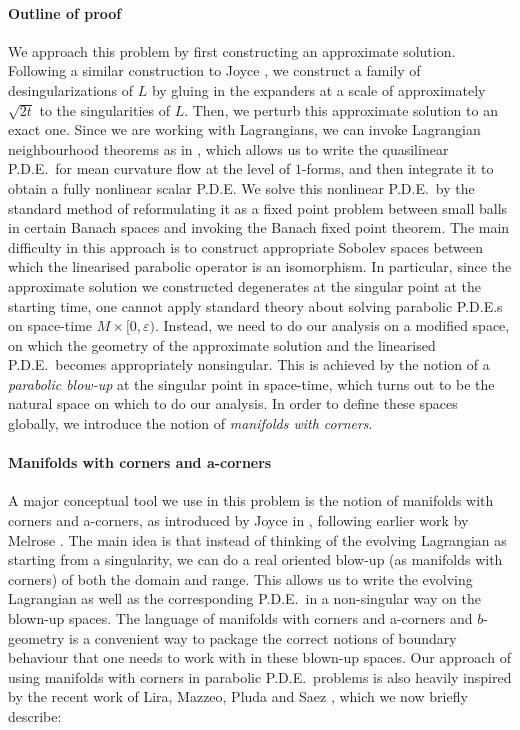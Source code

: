 \documentclass[10pt, a4paper]{article}
\theoremstyle{plain}%
\theoremstyle{definition}
\numberwithin{figure}{section}
\numberwithin{equation}{section}
\newcommand{\ep}{\varepsilon}
\begin{document}
\paragraph*{\textbf{Outline of proof}} We approach this problem by first constructing an approximate solution. Following a similar construction to Joyce \cite{Joy04}, we construct a family of desingularizations of $L$ by gluing in the expanders at a scale of approximately $\sqrt{2t}$ to the singularities of $L$. Then, we perturb this approximate solution to an exact one. Since we are working with Lagrangians, we can invoke Lagrangian neighbourhood theorems as in \cite{Joy04}, which allows us to write the quasilinear P.D.E.\ for mean curvature flow at the level of $1$-forms, and then integrate it to obtain a fully nonlinear scalar P.D.E. We solve this nonlinear P.D.E.\ by the standard method of reformulating it as a fixed point problem between small balls in certain Banach spaces and invoking the Banach fixed point theorem. The main difficulty in this approach is to construct appropriate Sobolev spaces between which the linearised parabolic operator is an isomorphism. In particular, since the approximate solution we constructed degenerates at the singular point at the starting time, one cannot apply standard theory about solving parabolic P.D.E.s on space-time $M\times[0,\ep)$. Instead, we need to do our analysis on a modified space, on which the geometry of the approximate solution and the linearised P.D.E.\ becomes appropriately nonsingular. This is achieved by the notion of a \textit{parabolic blow-up} at the singular point in space-time, which turns out to be the natural space on which to do our analysis. In order to define these spaces globally, we introduce the notion of \textit{manifolds with corners}. 



\paragraph*{\textbf{Manifolds with corners and a-corners}}
A major conceptual tool we use in this problem is the notion of manifolds with corners and a-corners, as introduced by Joyce in \cite{Joy16}, following earlier work by Melrose \cite{Mel90,Mel93,Mel96}. The main idea is that instead of thinking of the evolving Lagrangian as starting from a singularity, we can do a real oriented blow-up (as manifolds with corners) of both the domain and range. This allows us to write the evolving Lagrangian as well as the corresponding P.D.E.\ in a non-singular way on the blown-up spaces. The language of manifolds with corners and a-corners and $b$-geometry is a convenient way to package the correct notions of boundary behaviour that one needs to work with in these blown-up spaces. Our approach of using manifolds with corners in parabolic P.D.E.\ problems is also heavily inspired by the recent work of Lira, Mazzeo, Pluda and Saez \cite{LMPS23}, which we now briefly describe:
\end{document}

